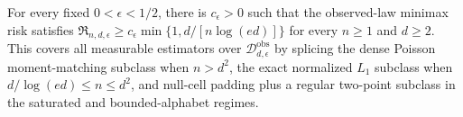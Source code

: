 For every fixed \(0<\epsilon<1/2\), there is \(c_\epsilon>0\) such that the observed-law minimax risk satisfies \(\mathfrak R_{n,d,\epsilon}\geq c_\epsilon\min\{1,d/[n\log(ed)]\}\) for every \(n\geq1\) and \(d\geq2\).  This covers all measurable estimators over \(\mathcal D_{d,\epsilon}^{\mathrm{obs}}\) by splicing the dense Poisson moment-matching subclass when \(n>d^2\), the exact normalized \(L_1\) subclass when \(d/\log(ed)\leq n\leq d^2\), and null-cell padding plus a regular two-point subclass in the saturated and bounded-alphabet regimes.